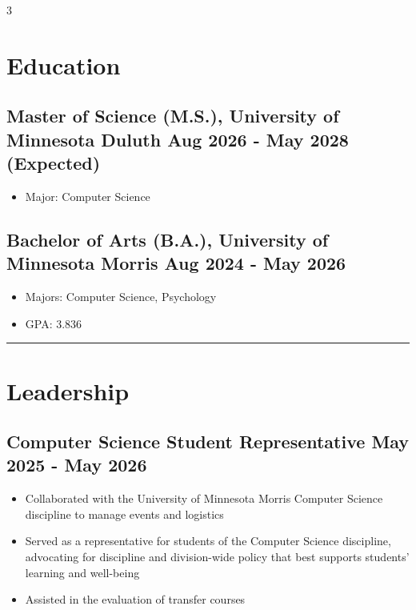 \documentclass{article}
\newcommand{\makedivider}[1]{\textcolor{black!20}{\rule{\textwidth}{#1}}}%
\newcommand{\dateto}[1]{
\normalsize
\textnormal{\hfill#1}}%
\begin{document}
\begin{paracol}{3}
\begin{tcolorbox}[colback=white, left=0.5in, right =0.5in, top=0.1in, breakable, colframe=white]
    \fontsize{12}{8}\selectfont
    \section*{Education}
    \subsection*{Master of Science (M.S.), University of Minnesota Duluth \dateto{Aug 2026 - May 2028 (Expected)}}
    \vspace{0.1in}
    \begin{itemize}
        \item Major: Computer Science
    \end{itemize}
\vspace{0.1in}
    \subsection*{Bachelor of Arts (B.A.), University of Minnesota Morris \dateto{Aug 2024 - May 2026}}
    \vspace{0.1in}
    \begin{itemize}
        \item Majors: Computer Science, Psychology
        \item GPA: 3.836
    \end{itemize}

    \vspace{0.25in}
    \makedivider{0.05in}
    \section*{Leadership}
    \subsection*{Computer Science Student Representative\dateto{May 2025 - May 2026}}
    \begin{itemize}
        \item Collaborated with the University of Minnesota Morris Computer Science discipline to manage events and logistics
        \item Served as a representative for students of the Computer Science discipline, advocating for discipline and division-wide policy that best supports students' learning and well-being
        \item Assisted in the evaluation of transfer courses
    \end{itemize}

\end{tcolorbox}
\end{paracol}
\end{document}
